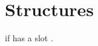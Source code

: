 %
%

\section{Structures}

\begin{LIST}{1cm}
  
  {
  \retval{\T} if  has a slot .
  }


\end{LIST}
